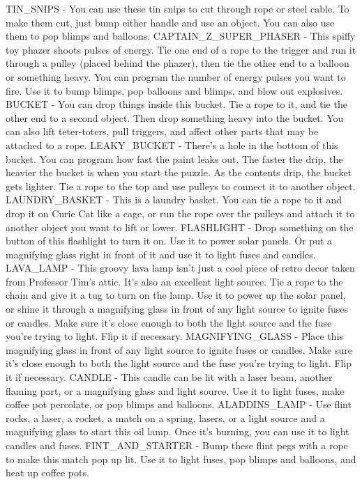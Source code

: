TIN_SNIPS - You can use these tin snips to cut through rope or steel cable. To make them cut, just bump either handle and use an object. You can also use them to pop blimps and balloons.
CAPTAIN_Z_SUPER_PHASER - This spiffy toy phazer shoots pulses of energy. Tie one end of a rope to the trigger and run it through a pulley (placed behind the phazer), then tie the other end to a balloon or something heavy. You can program the number of energy pulses you want to fire. Use it to bump blimps, pop balloons and blimps, and blow out explosives.
BUCKET - You can drop things inside this bucket. Tie a rope to it, and tie the other end to a second object. Then drop something heavy into the bucket. You can also lift teter-toters, pull triggers, and affect other parts that may be attached to a rope.
LEAKY_BUCKET - There's a hole in the bottom of this bucket. You can program how fast the paint leaks out. The faster the drip, the heavier the bucket is when you start the puzzle. As the contents drip, the bucket gets lighter. Tie a rope to the top and use pulleys to connect it to another object.
LAUNDRY_BASKET - This is a laundry basket. You can tie a rope to it and drop it on Curie Cat like a cage, or run the rope over the pulleys and attach it to another object you want to lift or lower.
FLASHLIGHT - Drop something on the button of this flashlight to turn it on. Use it to power solar panels. Or put a magnifying glass right in front of it and use it to light fuses and candles.
LAVA_LAMP - This groovy lava lamp isn't just a cool piece of retro decor taken from Professor Tim's attic. It's also an excellent light source. Tie a rope to the chain and give it a tug to turn on the lamp. Use it to power up the solar panel, or shine it through a magnifying glass in front of any light source to ignite fuses or candles. Make sure it's close enough to both the light source and the fuse you're trying to light. Flip it if necessary.
MAGNIFYING_GLASS - Place this magnifying glass in front of any light source to ignite fuses or candles. Make sure it's close enough to both the light source and the fuse you're trying to light. Flip it if necessary.
CANDLE - This candle can be lit with a laser beam, another flaming part, or a magnifying glass and light source. Use it to light fuses, make coffee pot percolate, or pop blimps and balloons.
ALADDINS_LAMP - Use flint rocks, a laser, a rocket, a match on a spring, lasers, or a light source and a magnifying glass to start this oil lamp. Once it's burning, you can use it to light candles and fuses.
FINT_AND_STARTER - Bump these flint pegs with a rope to make this match pop up lit. Use it to light fuses, pop blimps and balloons, and heat up coffee pots.
